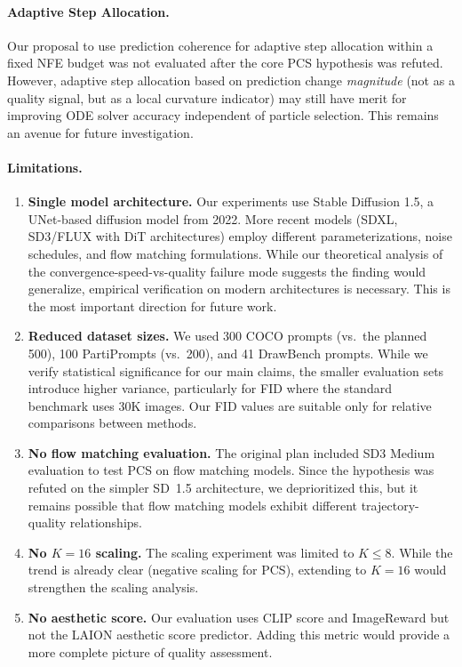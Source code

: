 \documentclass{article}
\newcommand{\pcs}{\textsc{PCS}}
\begin{document}
\paragraph{Adaptive Step Allocation.} Our proposal to use prediction coherence for adaptive step allocation within a fixed NFE budget was not evaluated after the core \pcs{} hypothesis was refuted. However, adaptive step allocation based on prediction change \emph{magnitude} (not as a quality signal, but as a local curvature indicator) may still have merit for improving ODE solver accuracy independent of particle selection. This remains an avenue for future investigation.

\paragraph{Limitations.}
\begin{enumerate}
    \item \textbf{Single model architecture.} Our experiments use Stable Diffusion 1.5, a UNet-based diffusion model from 2022. More recent models (SDXL, SD3/FLUX with DiT architectures) employ different parameterizations, noise schedules, and flow matching formulations. While our theoretical analysis of the convergence-speed-vs-quality failure mode suggests the finding would generalize, empirical verification on modern architectures is necessary. This is the most important direction for future work.
    \item \textbf{Reduced dataset sizes.} We used 300 COCO prompts (vs.\ the planned 500), 100 PartiPrompts (vs.\ 200), and 41 DrawBench prompts. While we verify statistical significance for our main claims, the smaller evaluation sets introduce higher variance, particularly for FID where the standard benchmark uses 30K images. Our FID values are suitable only for relative comparisons between methods.
    \item \textbf{No flow matching evaluation.} The original plan included SD3 Medium evaluation to test \pcs{} on flow matching models. Since the hypothesis was refuted on the simpler SD~1.5 architecture, we deprioritized this, but it remains possible that flow matching models exhibit different trajectory-quality relationships.
    \item \textbf{No $K=16$ scaling.} The scaling experiment was limited to $K \leq 8$. While the trend is already clear (negative scaling for \pcs{}), extending to $K=16$ would strengthen the scaling analysis.
    \item \textbf{No aesthetic score.} Our evaluation uses CLIP score and ImageReward but not the LAION aesthetic score predictor. Adding this metric would provide a more complete picture of quality assessment.

\end{enumerate}
\end{document}
